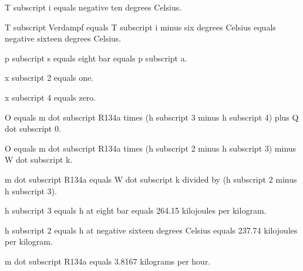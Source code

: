 T subscript i equals negative ten degrees Celsius.

T subscript Verdampf equals T subscript i minus six degrees Celsius equals negative sixteen degrees Celsius.

p subscript s equals eight bar equals p subscript a.

x subscript 2 equals one.

x subscript 4 equals zero.

O equals m dot subscript R134a times (h subscript 3 minus h subscript 4) plus Q dot subscript 0.

O equals m dot subscript R134a times (h subscript 2 minus h subscript 3) minus W dot subscript k.

m dot subscript R134a equals W dot subscript k divided by (h subscript 2 minus h subscript 3).

h subscript 3 equals h at eight bar equals 264.15 kilojoules per kilogram.

h subscript 2 equals h at negative sixteen degrees Celsius equals 237.74 kilojoules per kilogram.

m dot subscript R134a equals 3.8167 kilograms per hour.